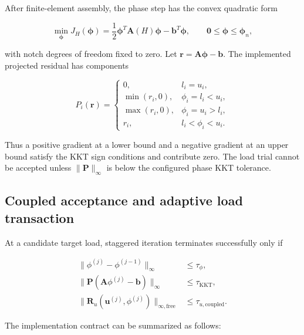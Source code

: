 \documentclass[11pt,a4paper]{article}
\begin{document}
After finite-element assembly, the phase step has the convex quadratic form

\begin{equation}
  \min_{\boldsymbol{\phi}}
  J_H(\boldsymbol{\phi})
  =\frac12\boldsymbol{\phi}^{T}\boldsymbol{A}(H)\boldsymbol{\phi}
   -\boldsymbol{b}^{T}\boldsymbol{\phi},
  \qquad
  \boldsymbol{0}\le\boldsymbol{\phi}\le\boldsymbol{\phi}_n,
  \label{eq:phase-qp}
\end{equation}

with notch degrees of freedom fixed to zero. Let
$\boldsymbol{r}=\boldsymbol{A}\boldsymbol{\phi}-\boldsymbol{b}$. The implemented
projected residual has components

\begin{equation}
  P_i(\boldsymbol{r})=
  \begin{cases}
    0, & l_i=u_i,\\
    \min(r_i,0), & \phi_i=l_i<u_i,\\
    \max(r_i,0), & \phi_i=u_i>l_i,\\
    r_i, & l_i<\phi_i<u_i.
  \end{cases}
  \label{eq:projected-gradient}
\end{equation}

Thus a positive gradient at a lower bound and a negative gradient at an upper
bound satisfy the KKT sign conditions and contribute zero. The load trial cannot
be accepted unless $\|\boldsymbol{P}\|_\infty$ is below the configured phase
KKT tolerance.

\subsection{Coupled acceptance and adaptive load transaction}

At a candidate target load, staggered iteration terminates successfully only if

\begin{align}
  \|\phi^{(j)}-\phi^{(j-1)}\|_\infty
    &\le \tau_\phi, \\
  \|\boldsymbol{P}(\boldsymbol{A}\phi^{(j)}-\boldsymbol{b})\|_\infty
    &\le \tau_{\mathrm{KKT}}, \\
  \|\boldsymbol{R}_u(\boldsymbol{u}^{(j)},\phi^{(j)})\|_{\infty,\mathrm{free}}
    &\le \tau_{u,\mathrm{coupled}}.
  \label{eq:coupled-tests}
\end{align}

The implementation contract can be summarized as follows:
\end{document}
